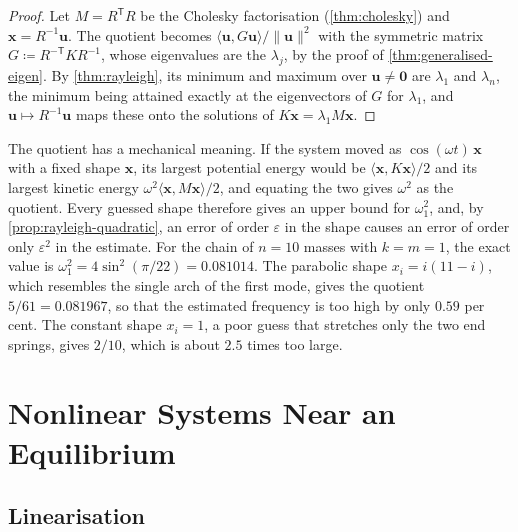 \begin{proof}
Let $M=R^{\mathsf T}R$ be the Cholesky factorisation (\cref{thm:cholesky}) and $\mathbf x=R^{-1}\mathbf u$. The quotient becomes $\langle\mathbf u,G\mathbf u\rangle/\|\mathbf u\|^2$ with the symmetric matrix $G\coloneqq R^{-\mathsf T}KR^{-1}$, whose eigenvalues are the $\lambda_j$, by the proof of \cref{thm:generalised-eigen}. By \cref{thm:rayleigh}, its minimum and maximum over $\mathbf u\ne\mathbf 0$ are $\lambda_1$ and $\lambda_n$, the minimum being attained exactly at the eigenvectors of $G$ for $\lambda_1$, and $\mathbf u\mapsto R^{-1}\mathbf u$ maps these onto the solutions of $K\mathbf x=\lambda_1M\mathbf x$.
\end{proof}

The quotient has a mechanical meaning. If the system moved as $\cos(\omega t)\,\mathbf x$ with a fixed shape $\mathbf x$, its largest potential energy would be $\langle\mathbf x,K\mathbf x\rangle/2$ and its largest kinetic energy $\omega^2\langle\mathbf x,M\mathbf x\rangle/2$, and equating the two gives $\omega^2$ as the quotient. Every guessed shape therefore gives an upper bound for $\omega_1^2$, and, by \cref{prop:rayleigh-quadratic}, an error of order $\varepsilon$ in the shape causes an error of order only $\varepsilon^2$ in the estimate. For the chain of $n=10$ masses with $k=m=1$, the exact value is $\omega_1^2=4\sin^2(\pi/22)=0.081014$. The parabolic shape $x_i=i(11-i)$, which resembles the single arch of the first mode, gives the quotient $5/61=0.081967$, so that the estimated frequency is too high by only $0.59$ per cent. The constant shape $x_i=1$, a poor guess that stretches only the two end springs, gives $2/10$, which is about $2.5$ times too large.

\section{Nonlinear Systems Near an Equilibrium}
\label{sec:nonlinear-systems}

\subsection{Linearisation}

